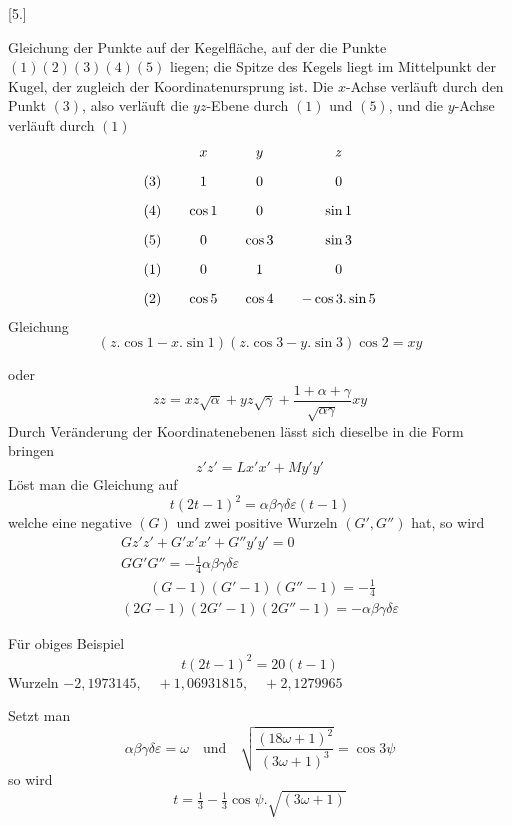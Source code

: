 \begingroup
\renewcommand{\arraystretch}{1.45}
\fancyhead[L]{}
\providecommand{\EqOverGt}{\mathrel{\substack{=\\>}}}
\par\medskip{}\centerline{[5.]}\nobreak\smallskip
Gleichung der Punkte auf der Kegelfläche, auf der die Punkte $(1)\allowbreak(2)\allowbreak(3)\allowbreak(4)\allowbreak(5)$ liegen; die Spitze des Kegels liegt im Mittelpunkt der Kugel, der zugleich der Koordinatenursprung ist. Die $x$-Achse verläuft durch den Punkt $(3)$, also verläuft die $yz$-Ebene durch $(1)$ und $(5)$, und die $y$-Achse verläuft durch $(1)$
\[
\begin{array}{c@{\qquad}c@{\qquad}c@{\qquad}c} &x&y&z\\[9pt] (3)&1&0&0\\[9pt] (4)&\cos1&0&\sin1\\[9pt] (5)&0&\cos3&\sin3\\[9pt] (1)&0&1&0\\[9pt] (2)&\cos5&\cos4&-\cos3\mathord{.}\sin5 \end{array}
\]
Gleichung
\[
(z\mathord{.}\cos1-x\mathord{.}\sin1)(z\mathord{.}\cos3-y\mathord{.}\sin3)\cos2=xy
\]




oder
\[
zz=xz\surd{\alpha}+yz\surd{\gamma}+\frac{1+\alpha+\gamma}{\surd{\alpha\gamma}}xy
\]
Durch Veränderung der Koordinatenebenen lässt sich dieselbe in die Form
bringen
\[
z'z'=Lx'x'+My'y'
\]
Löst man die Gleichung auf
\[
t(2t-1)^2=\alpha\beta\gamma\delta\varepsilon(t-1)
\]
welche eine negative $(G)$ und zwei positive Wurzeln $(G',G'')$ hat, so wird
\[
\begin{gathered} Gz'z'+G'x'x'+G''y'y'=0\\[9pt] GG'G''=-\tfrac14\alpha\beta\gamma\delta\varepsilon\\[9pt] \qquad(G-1)(G'-1)(G''-1)=-\tfrac14\\[9pt] (2G-1)(2G'-1)(2G''-1)=-\alpha\beta\gamma\delta\varepsilon \end{gathered}
\]

Für obiges Beispiel
\[
t(2t-1)^2=20(t-1)
\]
Wurzeln\quad
$-2{,}1973145,\quad+1{,}06931815,\quad+2{,}1279965$

Setzt man
\[
\alpha\beta\gamma\delta\varepsilon=\omega\quad\text{und}\quad \surd{\frac{(18\omega+1)^2}{(3\omega+1)^{3}}}=\cos3\psi
\]
so wird
\[
t=\tfrac13-\tfrac13\cos\psi\mathord{.}\surd{(3\omega+1)}
\]


